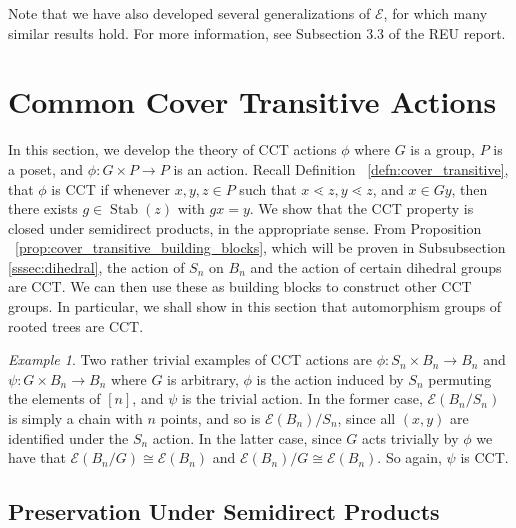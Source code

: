 \documentclass[smallextended, envcountsame, numbook]{svjour3}
\theoremstyle{plain}
\theoremstyle{definition}
\theoremstyle{remark}
\newtheorem{eg}[thm]{Example}
\numberwithin{equation}{section}
\newcommand\ssec{\subsection}
\newcommand\Stab{\operatorname{Stab}}
\begin{document}
Note that we have also developed several generalizations of $\mathcal E$, for which many similar results hold. For more information, see Subsection 3.3 of the REU report.


\section{Common Cover Transitive Actions}
\label{sec:cover_transitive}
In this section, we develop the theory of CCT actions $\phi$ where $G$ is a group, $P$ is a poset, and $\phi:G\times P \rightarrow P$ is an action. Recall Definition ~\ref{defn:cover_transitive}, that $\phi$ is CCT if whenever $x,y,z \in P$ such that $x\lessdot z,y\lessdot z$, and $x \in Gy$, then there exists $g \in \Stab(z)$ with $gx = y$.  We show that the CCT property is closed under semidirect products, in the appropriate sense. From Proposition ~\ref{prop:cover_transitive_building_blocks}, which will be proven in Subsubsection \ref{sssec:dihedral}, the action of $S_n$ on $B_n$ and the action of certain dihedral groups are CCT. We can then use these as building blocks to construct other CCT groups. In particular, we shall show in this section that automorphism groups of rooted trees are CCT.

\begin{eg}
\label{eg:trivial_edgequot}
Two rather trivial examples of CCT actions are $\phi\colon S_n\times B_n \rightarrow B_n$ and $\psi\colon G\times B_n\rightarrow B_n$ where $G$ is arbitrary, $\phi$ is the action induced by $S_n$ permuting the elements of $[n]$, and $\psi$ is the trivial action. In the former case, $\mathcal E(B_n/S_n)$ is simply a chain with $n$ points, and so is $\mathcal E(B_n)/S_n$, since all $(x, y)$ are identified under the $S_n$ action. In the latter case, since $G$ acts trivially by $\phi$ we have that $\mathcal E(B_n/G) \cong \mathcal E(B_n)$ and $\mathcal E(B_n)/G \cong \mathcal E(B_n)$. So again, $\psi$ is CCT.
\end{eg}

\ssec{Preservation Under Semidirect Products}
\label{ssec:semidirect_product_preservation}
\end{document}
